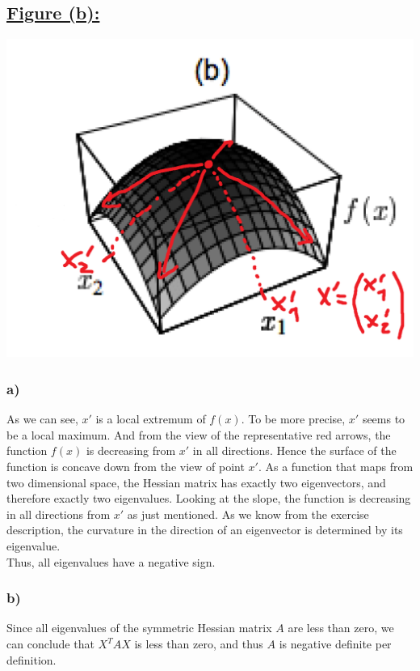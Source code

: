 \documentclass[a4paper]{article}
\begin{document}
\newpage
    \subsection*{\underline{Figure (b):}}
        \includegraphics[width=0.8\linewidth]{Assignment 5/2.png}
        \subsubsection*{a)}
            As we can see, $x'$ is a local extremum of $f(x)$. To be more precise, $x'$ seems to be a local maximum.
            And from the view of the representative red arrows, the function $f(x)$ is decreasing from $x'$ in all directions.
            Hence the surface of the function is concave down from the view of point $x'$.
            As a function that maps from two dimensional space, the Hessian matrix has exactly two eigenvectors, and therefore exactly two eigenvalues.
            Looking at the slope, the function is decreasing in all directions from $x'$ as just mentioned.
            As we know from the exercise description, the curvature in the direction of an eigenvector is determined by its eigenvalue.\\
            Thus, all eigenvalues have a negative sign.

        \subsubsection*{b)}
            Since all eigenvalues of the symmetric Hessian matrix $A$ are less than zero, we can conclude that $X^T A X$ is less than zero, and thus $A$ is negative definite per definition.


\newpage
\end{document}
